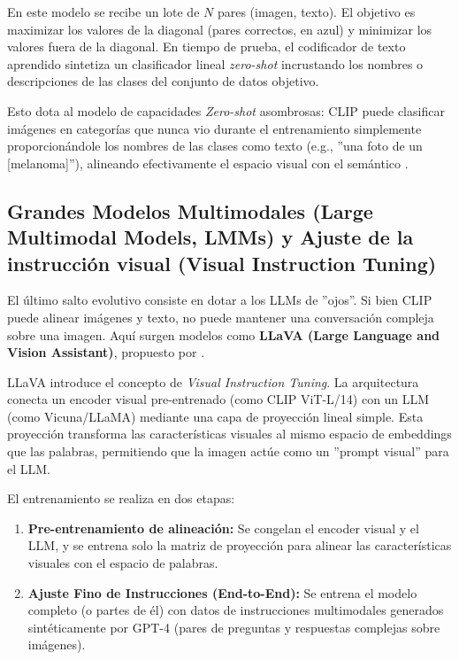 \documentclass[11pt, a4paper]{article}
\begin{document}
En este modelo se recibe un lote de $N$ pares (imagen, texto). El objetivo es maximizar los valores de la diagonal (pares correctos, en azul) y minimizar los valores fuera de la diagonal.
En tiempo de prueba, el codificador de texto aprendido sintetiza un clasificador lineal \textit{zero-shot} incrustando los nombres o descripciones de las clases del conjunto de datos objetivo.

Esto dota al modelo de capacidades \textit{Zero-shot} asombrosas: CLIP puede clasificar imágenes en categorías que nunca vio durante el entrenamiento simplemente proporcionándole los nombres de
las clases como texto (e.g., ''una foto de un [melanoma]''), alineando efectivamente el espacio visual con el semántico \cite{radford_learning_nodate}.

\subsection{Grandes Modelos Multimodales (Large Multimodal Models, LMMs) y Ajuste de la instrucción visual (Visual Instruction Tuning)}

El último salto evolutivo consiste en dotar a los LLMs de ''ojos''. Si bien CLIP puede alinear imágenes y texto, no puede mantener una conversación compleja sobre una imagen. Aquí surgen modelos
como \textbf{LLaVA (Large Language and Vision Assistant)}, propuesto por \cite{liu_visual_2023}.

LLaVA introduce el concepto de \textit{Visual Instruction Tuning}. La arquitectura conecta un encoder visual pre-entrenado (como CLIP ViT-L/14) con un LLM (como Vicuna/LLaMA) mediante una capa
de proyección lineal simple. Esta proyección transforma las características visuales al mismo espacio de embeddings que las palabras, permitiendo que la imagen actúe como un ''prompt visual'' 
para el LLM.

El entrenamiento se realiza en dos etapas:
\begin{enumerate}
    \item \textbf{Pre-entrenamiento de alineación:} Se congelan el encoder visual y el LLM, y se entrena solo la matriz de proyección para alinear las características visuales con el espacio 
    de palabras.
    \item \textbf{Ajuste Fino de Instrucciones (End-to-End):} Se entrena el modelo completo (o partes de él) con datos de instrucciones multimodales generados sintéticamente por GPT-4 
    (pares de preguntas y respuestas complejas sobre imágenes).
\end{enumerate}
\end{document}
